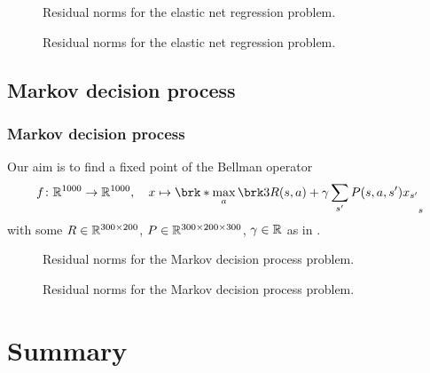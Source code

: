 \begin{frame}
	\begin{figure}
		\centering
		{\scriptsize
		
		}
		\caption{Residual norms for the elastic net regression problem.}
	\end{figure}
\end{frame}

\begin{frame}
	\begin{figure}
		\centering
		{\scriptsize
		
		}
		\caption{Residual norms for the elastic net regression problem.}
	\end{figure}
\end{frame}
\subsection{Markov decision process}

\begin{frame}
	\frametitle{Markov decision process}
	Our aim is to find a fixed point of the Bellman operator
	\begin{align*}
		f\colon\R^{1000}\to\R^{1000}, \quad x\mapsto \brk*{\max_{a} \brk3{ R(s,a)+\gamma \sum_{s'}P(s,a,s')x_{s'}}}_{s}
	\end{align*}
	with some $R\in\mathbb{R}^{300\times 200}$, $P\in\mathbb{R}^{300\times 200\times 300}$, $\gamma\in\mathbb{R}$ as in \cite{ZhaAA}.
\end{frame}


\begin{frame}
	\begin{figure}
		\centering
		{\scriptsize
		
		}
		\caption{Residual norms for the Markov decision process problem.}
	\end{figure}
\end{frame}

\begin{frame}
	\begin{figure}
		\centering
		{\scriptsize
		
		}
		\caption{Residual norms for the Markov decision process problem.}
	\end{figure}
\end{frame}

\section{Summary}


